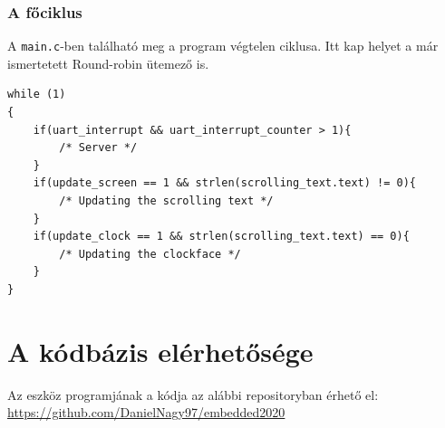 \documentclass[a4paper, 12pt]{article}
\begin{document}
\subsubsection{A főciklus}

A \texttt{main.c}-ben található meg a program végtelen ciklusa. Itt kap helyet a már ismertetett Round-robin ütemező is.

\begin{lstlisting}[style=CStyle]
while (1)
{
	if(uart_interrupt && uart_interrupt_counter > 1){
		/* Server */
	}
	if(update_screen == 1 && strlen(scrolling_text.text) != 0){
		/* Updating the scrolling text */
	}
	if(update_clock == 1 && strlen(scrolling_text.text) == 0){
		/* Updating the clockface */
	}
}
\end{lstlisting}

\section{A kódbázis elérhetősége}
Az eszköz programjának a kódja az alábbi repositoryban érhető el:\\
\url{https://github.com/DanielNagy97/embedded2020}
\end{document}

